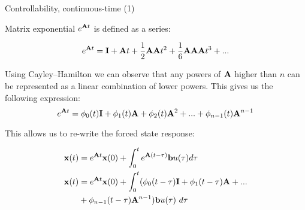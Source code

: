 \documentclass{beamer}
\begin{document}
\begin{frame}{Controllability, continuous-time (1)}
	\begin{flushleft}
		
		Matrix exponential $e^{\mathbf{A}t}$ is defined as a series:
		
		\begin{equation}
			e^{\mathbf{A}t} = \mathbf{I}+\mathbf{A}t+\frac{1}{2} \mathbf{A}\mathbf{A}t^2
			+\frac{1}{6} \mathbf{A}\mathbf{A}\mathbf{A}t^3 + ...
		\end{equation}
	
		Using Cayley–Hamilton we can observe that any powers of $\mathbf{A}$ higher than $n$ can be represented as a linear combination of lower powers. This gives us the following expression:
		\begin{equation}
			e^{\mathbf{A}t} = \phi_0(t)\mathbf{I}+\phi_1(t)\mathbf{A}+\phi_2(t) \mathbf{A}^2 + ...
 + \phi_{n-1}(t) \mathbf{A}^{n-1}
		\end{equation}
		
		This allows us to re-write the forced state response:
		
		\begin{align*}
			\mathbf{x}(t) &= e^{\mathbf{A}t}  \mathbf{x}(0) + 
			\int_{0}^{t} e^{\mathbf{A}(t-\tau)} \mathbf{b}  u(\tau) d\tau
			\\
			\mathbf{x}(t) &= e^{\mathbf{A}t}  \mathbf{x}(0) + 
			\int_{0}^{t} 
			( \phi_0(t-\tau)\mathbf{I}+\phi_1(t-\tau)\mathbf{A}+ ... 
			\\
			&+ \phi_{n-1}(t-\tau) \mathbf{A}^{n-1} ) 
			\mathbf{b}  u(\tau) \ d\tau
		\end{align*}
		
		
	\end{flushleft}
\end{frame}
\end{document}
